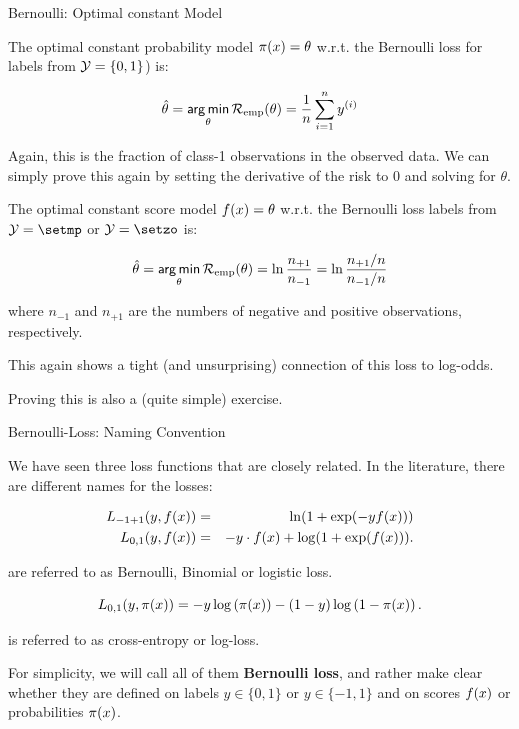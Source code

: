 \begin{vbframe}{Bernoulli: Optimal constant Model}

The optimal constant probability model $\pi(x) = \theta$ w.r.t. the Bernoulli loss for labels from $\mathcal{Y} = \{0, 1\}$) is:

\begin{eqnarray*}
  \hat{\theta} = \mathop{\sf arg\,min}_{\theta} \mathcal{R}_{\text{emp}}(\theta) = \frac{1}{n} \sum_{i=1}^n y^{(i)}
\end{eqnarray*}

Again, this is the fraction of class-1 observations in the observed data.
We can simply prove this again by setting the derivative of the risk to 0 and solving for $\theta$.

\framebreak

The optimal constant score model $f(x) = \theta$ w.r.t. the Bernoulli loss labels from $\Yspace = \setmp$ or $\Yspace = \setzo$ is:

\begin{eqnarray*}
  \hat{\theta} = \mathop{\sf arg\,min}_{\theta} \mathcal{R}_{\text{emp}}(\theta) = \ln \frac{n_{+1}}{n_{-1}} = \ln \frac{n_{+1}/n}{n_{-1}/n} 
\end{eqnarray*}

where $n_{-1}$ and $n_{+1}$ are the numbers of negative and positive observations, respectively.

\lz

This again shows a tight (and unsurprising) connection of this loss to log-odds.

\lz

Proving this is also a (quite simple) exercise.

\end{vbframe}

\begin{vbframe}{Bernoulli-Loss: Naming Convention}

We have seen three loss functions that are closely related. In the literature, there are different names for the losses: 

\begin{eqnarray*}
  L_{-1+1}(y, f(x)) &=& \ln(1+\exp(-yf(x))) \\
  L_{0, 1}(y, f(x)) &=& - y \cdot f(x) + \log(1 + \exp(f(x))). 
\end{eqnarray*}

are referred to as Bernoulli, Binomial or logistic loss. 

  $$
    L_{0,1}(y, \pi(x)) = - y \log \left(\pi(x)\right) - (1 - y) \log \left(1 - \pi(x)\right). 
  $$

is referred to as cross-entropy or log-loss. 

\lz 

For simplicity, we will call all of them \textbf{Bernoulli loss}, and rather make clear whether they are defined on labels $y \in \{0, 1\}$ or $y \in \{-1, 1\}$ and on scores $f(x)$ or probabilities $\pi(x)$. 

\end{vbframe}


